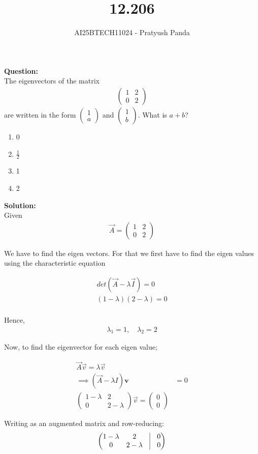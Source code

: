 \documentclass{beamer}
\title{12.206}
\author{AI25BTECH11024 - Pratyush Panda}
\theoremstyle{remark}
\newcommand{\myvec}[1]{\ensuremath{\begin{pmatrix}#1\end{pmatrix}}}
\let\vec\mathbf
\numberwithin{equation}{section}
\begin{document}
\maketitle

\begin{frame}
\textbf{Question: } \\
The eigenvectors of the matrix 
\begin{align}
\myvec{1 & 2 \\ 0 & 2}
\end{align}
are written in the form $\myvec{1 \\ a}$ and $\myvec{1 \\ b}$. What is $a+b$?
\begin{enumerate}
\item[a] 0
\item[b] $\frac{1}{2}$
\item[c] 1
\item[d] 2
\end{enumerate}
\end{frame}

\begin{frame}
\textbf{Solution: } \\
Given
\begin{align}
\Vec{A} = \myvec{1 & 2 \\ 0 & 2}
\end{align}

We have to find the eigen vectors. For that we first have to find the eigen values using the characteristic equation

\begin{align}
det(\Vec{A} - \lambda \Vec{I}) = 0 \\
(1 - \lambda)(2 - \lambda) = 0 \\
\end{align}

Hence,
\begin{align}
\lambda_1 = 1, \quad \lambda_2 = 2
\end{align}
\end{frame}

\begin{frame}
Now, to find the eigenvector for each eigen value;

\begin{align}
\Vec{A}\Vec{v} = \lambda\Vec{v} \\
\implies (\Vec{A} - \lambda I)\vec{v} &= 0 \\
\myvec{1-\lambda & 2 \\ 0 & 2 - \lambda}\Vec{v} = \myvec{0 \\ 0}
\end{align}

Writing as an augmented matrix and row-reducing:
\begin{align}
\myvec{1-\lambda & 2 & \vline & 0 \\ 0 & 2-\lambda & \vline & 0}
\end{align}
\end{frame}
\end{document}
